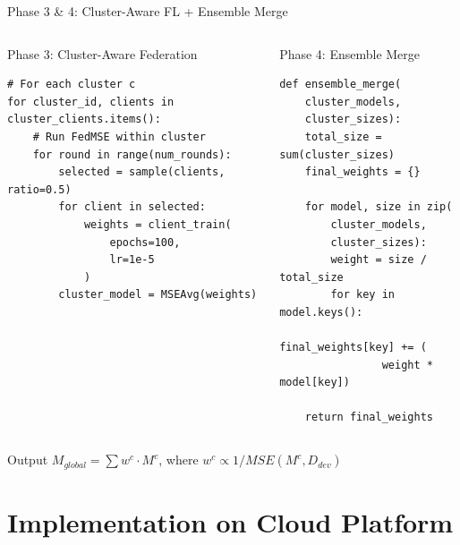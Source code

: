 \documentclass[10pt, aspectratio=169]{beamer}
\begin{document}
\begin{frame}[t]{Phase 3 \& 4: Cluster-Aware FL + Ensemble Merge}
    \begin{columns}
        \begin{block}{Phase 3: Cluster-Aware Federation}
            \begin{lstlisting}[basicstyle=\ttfamily\scriptsize]
# For each cluster c
for cluster_id, clients in cluster_clients.items():
    # Run FedMSE within cluster
    for round in range(num_rounds):
        selected = sample(clients, ratio=0.5)
        for client in selected:
            weights = client_train(
                epochs=100, 
                lr=1e-5
            )
        cluster_model = MSEAvg(weights)
            \end{lstlisting}
        \end{block}
        
        \begin{block}{Phase 4: Ensemble Merge}
            \begin{lstlisting}[basicstyle=\ttfamily\scriptsize]
def ensemble_merge(
    cluster_models, 
    cluster_sizes):
    total_size = sum(cluster_sizes)
    final_weights = {}
    
    for model, size in zip(
        cluster_models, 
        cluster_sizes):
        weight = size / total_size
        for key in model.keys():
            final_weights[key] += (
                weight * model[key])
    
    return final_weights
            \end{lstlisting}
        \end{block}
    \end{columns}
    
    \vspace{0.3cm}
    \begin{alertblock}{Output}
        $M_{global} = \sum w^c \cdot M^c$, where $w^c \propto 1/MSE(M^c, D_{dev})$
    \end{alertblock}
\end{frame}


\section{Implementation on Cloud Platform}
\end{document}
